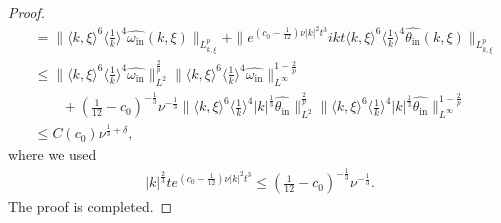 \documentclass[reqno, 12pt]{amsart} %
\theoremstyle{plain} %
\theoremstyle{definition}
\theoremstyle{remark}
\numberwithin{equation}{section} %
\begin{document}
\begin{proof}
\begin{align*}
			&= \| \langle k, \xi \rangle^6\langle\frac{1}{k}\rangle^4  \widehat{\omega_{\text {in}} }(k, \xi) \|_{L_{k, \xi}^p}    +   \|  e^{ (c_0 - \frac{1}{12} ) \nu |k|^2 t^3} ikt \langle k, \xi \rangle^6\langle\frac{1}{k}\rangle^4  \widehat{\theta_{\text {in}} }(k, \xi) \|_{L_{k, \xi}^p}\\
			&\leq   \| \langle k, \xi \rangle^6\langle\frac{1}{k}\rangle^4  \widehat{\omega_{\text {in}} } \|_{L^2}^{\frac2p} \| \langle k, \xi \rangle^6\langle\frac{1}{k}\rangle^4  \widehat{\omega_{\text {in}} } \|_{L^\infty}^{1- \frac2p}  \\
			&\qquad + (\frac{1}{12} - c_0)^{-\frac13} \nu^{-\frac13} \| \langle k, \xi \rangle^6\langle\frac{1}{k}\rangle^4  |k|^\frac13 \widehat{\theta_{\text {in}} }\|_{L^2}^{\frac2p} \| \langle k, \xi \rangle^6\langle\frac{1}{k}\rangle^4  |k|^\frac13\widehat{\theta_{\text {in}} } \|_{L^\infty}^{1- \frac2p}   \\
			& \leq C(c_0) \nu^{\frac13 + \delta},
		\end{align*}
		where we used 
		\begin{equation*}\begin{aligned}
				|k|^\frac23 t e^{ (c_0 - \frac{1}{12} ) \nu |k|^2 t^3} \leq (\frac{1}{12} - c_0)^{-\frac13} \nu^{-\frac13}.
		\end{aligned}\end{equation*}
		The proof is completed.
	\end{proof}
	
\end{document}
